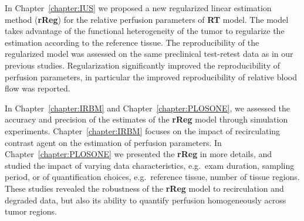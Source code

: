 In Chapter~\ref{chapter:IUS} we proposed a new regularized linear estimation method (\textbf{rReg}) for the relative perfusion parameters of \textbf{RT} model.
The model takes advantage of the functional heterogeneity of the tumor to regularize the estimation according to the reference tissue.
The reproducibility of the regularized model was assessed on the same preclinical test-retest data as in our previous studies.
Regularization significantly improved the reproducibility of perfusion parameters, in particular the improved reproducibility of relative blood flow was reported.

In Chapter~\ref{chapter:IRBM} and Chapter~\ref{chapter:PLOSONE}, we assessed the accuracy and precision of the estimates of the \textbf{rReg} model through simulation experiments.
Chapter~\ref{chapter:IRBM} focuses on the impact of recirculating contrast agent on the estimation of perfusion parameters.
In Chapter~\ref{chapter:PLOSONE} we presented the \textbf{rReg} in more details, and studied the impact of varying data characteristics, e.g.~exam duration, sampling period, or of quantification choices, e.g.~reference tissue, number of tissue regions.
These studies revealed the robustness of the \textbf{rReg} model to recirculation and degraded data, but also its ability to quantify perfusion homogeneously across tumor regions.



% 
% 